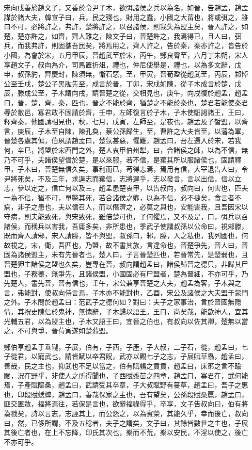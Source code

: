 \begin{pinyinscope}
宋向戌善於趙文子，又善於令尹子木，欲弭諸侯之兵以為名，如晉，告趙孟，趙孟謀於諸大夫，韓宣子曰，兵，民之殘也，財用之蠹，小國之大菑也，將或弭之，雖曰不可，必將許之，弗許，楚將許之，以召諸侯，則我失為盟主矣，晉人許之，如楚，楚亦許之，如齊，齊人難之，陳文子曰，晉楚許之，我焉得已，且人曰，弭兵，而我弗許，則固攜吾民矣，將焉用之，齊人許之，告於秦，秦亦許之，皆告於小國，為會於宋，五月甲辰，晉趙武至於宋，丙午，鄭良霄至，六月丁未朔，宋人享趙文子，叔向為介，司馬置折俎，禮也，仲尼使舉是，禮也，以為多文辭，戊申，叔孫豹，齊慶封，陳須無，衛石惡，至，甲寅，晉荀盈從趙武至，丙辰，邾悼公至壬戌，楚公子黑肱先至，成言於晉，丁卯，宋戌如陳，從子木成言於楚，戊辰，滕成公至，子木謂向戌，請晉楚之從，交相見也，庚午，向戌復於趙孟，趙孟曰，晉，楚，齊，秦，匹也，晉之不能於齊，猶楚之不能於秦也，楚君若能使秦君辱於敝邑，寡君敢不固請於齊，壬申，左師復言於子木，子木使馹謁諸王，王曰，釋齊秦，他國請相見也，秋，七月，戊寅，左師至，是夜也，趙孟及子皙盟，以齊言，庚辰，子木至自陳，陳孔奐，蔡公孫歸生，至，曹許之大夫皆至，以藩為軍，晉楚各處其偏，伯夙謂趙孟曰，楚氛甚惡，懼難，趙孟曰，吾左還入於宋，若我何，辛巳，將盟於宋西門之外，楚人衷甲伯州犁，曰，合諸侯之師，以為不信，無乃不可乎，夫諸侯望信於楚，是以來服，若不信，是棄其所以服諸侯也，固請釋甲，子木曰，晉楚無信久矣，事利而已，苟得志焉，焉用有信，大宰退告人曰，令尹將死矣，不及三年，求逞志而棄信，志將逞乎，志以發言，言以出信，信以立志，參以定之，信亡何以及三，趙孟患楚衷甲，以告叔向，叔向曰，何害也，匹夫一為不信，猶不可，單斃其死，若合諸侯之卿，以為不信，必不捷矣，食言者不病，非子之患也，夫以信召人，而以僭濟之，必莫之與也，安能害我，且吾因宋以守病，則夫能致死，與宋致死，雖倍楚可也，子何懼焉，又不及是，曰，弭兵以召諸侯，而稱兵以害我，吾庸多矣，非所患也，季武子使謂叔孫以公命曰，視邾滕，既而齊人請邾，宋人請滕，皆不與盟，叔孫曰，邾，滕，人之私也，我列國也，何故視之，宋，衛，吾匹也，乃盟，故不書其族，言違命也，晉楚爭先，晉人曰，晉固為諸侯盟主，未有先晉者也，楚人曰，子言晉楚匹也，若晉常先，是楚弱也，且晉楚狎主諸侯之盟也久矣，豈專在晉，叔向謂趙孟曰，諸侯歸晉之德只，非歸其尸盟也，子務德，無爭先，且諸侯盟，小國固必有尸盟者，楚為晉細，不亦可乎，乃先楚人，書先晉，晉有信也，壬午，宋公兼享晉楚之大夫，趙孟為客，子木與之言，弗能對，使叔向侍言焉，子木亦不能對也，乙酉，宋公及諸侯之大夫盟于蒙門之外。子木問於趙孟曰：范武子之德何如？對曰：夫子之家事治，言於晉國無隱情，其祝史陳信於鬼神，無愧辭，子木歸以語王。王曰，尚矣哉，能歆神人，宜其光輔五君，以為盟主也，子木又語王曰，宜晉之伯也，有叔向以佐其卿，楚無以當之，不可與爭，晉荀寅遂如楚蒞盟。

鄭伯享趙孟于垂隴，子展，伯有，子西，子產，子大叔，二子石，從，趙孟曰，七子從君，以寵武也，請皆賦以卒君貺，武亦以觀七子之志，子展賦草蟲，趙孟曰，善哉，民之主也，抑武也不足以當之，伯有賦鶉之賁賁，趙孟曰，床笫之言不踰閾，況在野乎，非使人之所得聞也，子西賦黍苗之四章，趙孟曰，寡君在，武何能焉，子產賦隰桑，趙孟曰，武請受其卒章，子大叔賦野有蔓草，趙孟曰，吾子之惠也，印段賦蟋蟀，趙孟曰，善哉保家之主也，吾有望矣，公孫段賦桑扈，趙孟曰，匪交匪敖，福將焉往，若保是言也，欲辭福祿得乎，卒享，文子告叔向曰，伯有將為戮矣，詩以言志，志誣其上，而公怨之，以為賓榮，其能久乎，幸而後亡，叔向曰，然，已侈所謂，不及五稔者，夫子之謂矣，文子曰，其餘皆數世之主也，子展其後亡者也，在上不忘降，印氏其次也，樂而不荒，樂以安民，不淫以使之，後亡不亦可乎。


\end{pinyinscope}
